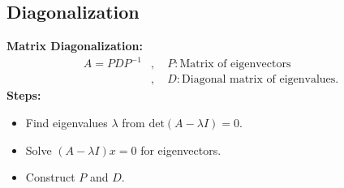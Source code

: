 \documentclass[10pt]{article}
\begin{document}
\begin{multicols}{2}
  \subsection*{Diagonalization}
  \textbf{Matrix Diagonalization:}
  \begin{align*}
    A = PDP^{-1}&, \quad P: \text{Matrix of eigenvectors} \\
    &, \quad D: \text{Diagonal matrix of eigenvalues}.
  \end{align*}
  \textbf{Steps:}
  \begin{itemize}
    \item Find eigenvalues \(\lambda\) from \(\text{det}(A - \lambda I) = 0\).
    \item Solve \((A - \lambda I)x = 0\) for eigenvectors.
    \item Construct \(P\) and \(D\).
  \end{itemize}

\end{multicols}
\end{document}
